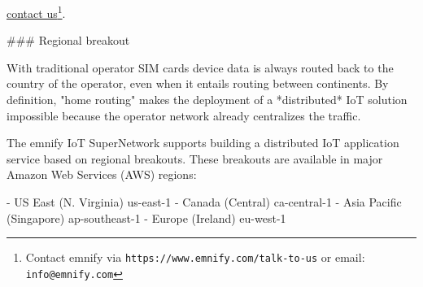 \documentclass[11pt, oneside]{article}   	%
\newcommand{\addspace}{\vspace{2mm}}
\begin{document}
\href{https://www.emnify.com/talk-to-us}{contact us}\footnote{Contact emnify via \texttt{https://www.emnify.com/talk-to-us} or email: \texttt{info@emnify.com}}.
\begin{markdown}

### Regional breakout

With traditional operator SIM cards device data is always routed back to the country of the operator, even when it entails routing between continents.
By definition, "home routing" makes the deployment of a *distributed* IoT solution impossible because the operator network already centralizes the traffic. 

The emnify IoT SuperNetwork supports building a distributed IoT application service based on regional breakouts.
These breakouts are available in major Amazon Web Services (AWS) regions:

\end{markdown}
\addspace
\begin{markdown}
- US East (N. Virginia) us-east-1
- Canada (Central) ca-central-1
- Asia Pacific (Singapore) ap-southeast-1
- Europe (Ireland) eu-west-1
\end{markdown}
\addspace
\end{document}
